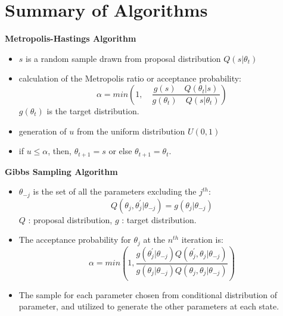 \documentclass{article}
\begin{document}
\section{Summary of Algorithms}
\begin{minipage}[t]{0.55\textwidth}
        \centering
        \textbf{Metropolis-Hastings Algorithm } \\
        \begin{itemize} 
            \item  $s$ is a random sample drawn from proposal distribution $Q(s|\theta_t)$ 
            \item calculation of the Metropolis ratio or acceptance probability:
            \begin{equation}
                \alpha = min\left( 1, \quad \frac{g(s) \quad Q(\theta_t|s)}{g(\theta_t) \quad Q(s|\theta_t)} \right) \nonumber
            \end{equation}
            $g(\theta_t)$ is the target distribution. 
            \item generation of $u$ from the uniform distribution $U(0,1)$
            \item if $u \leq \alpha$, then, $\theta_{t+1}=s$  or else $\theta_{t+1}=\theta_t$. 
        \end{itemize}
    \end{minipage}%
    \begin{minipage}[t]{0.55\textwidth}
        \centering
        \textbf{Gibbs Sampling Algorithm} \\
        \begin{itemize}
            \item $\theta_{-j}$ is the set of all the parameters excluding the $j^{th}$:
            \begin{equation}
                 Q(\theta_j,\theta^{'}_j|\theta_{-j}) = g(\theta_j|\theta_{-j}) \nonumber
            \end{equation}
            $Q$ : proposal distribution, $g$ : target distribution. 
            \item The acceptance probability for $\theta_j$ at the $n^{th}$ iteration is: 
            \begin{equation}
                \alpha = min \left( 1, \frac{g(\theta^{'}_j|\theta_{-j}) Q(\theta^{'}_j,\theta_j|\theta_{-j})}{g(\theta_j|\theta_{-j}) Q(\theta_j,\theta_j|\theta_{-j})} \right) \nonumber 
            \end{equation} 
            \item The sample for each parameter chosen from conditional distribution of parameter, and utilized to generate the other parameters at each state.
            
        \end{itemize}
    \end{minipage}

\printbibliography
\end{document}
